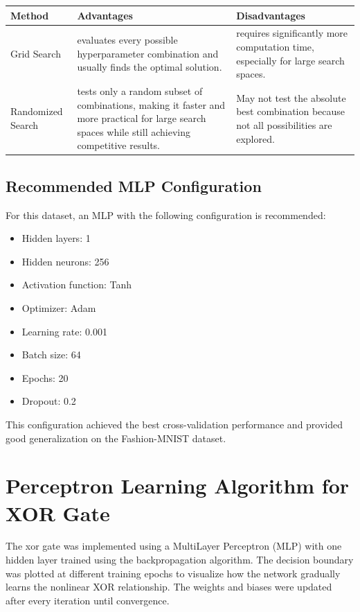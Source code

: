 \documentclass[11pt]{article}
\begin{document}
\begin{center}
\begin{tabular}{|p{4cm}|p{5cm}|p{5cm}|}
\hline
\textbf{Method} & \textbf{Advantages} & \textbf{Disadvantages}\\
\hline
Grid Search &
evaluates every possible hyperparameter combination and usually finds the optimal solution.
&
requires significantly more computation time, especially for large search spaces.
\\
\hline

Randomized Search &
tests only a random subset of combinations, making it faster and more practical for large search spaces while still achieving competitive results.
&
May not test the absolute best combination because not all possibilities are explored.
\\
\hline
\end{tabular}
\end{center}



\subsection{Recommended MLP Configuration}
For this dataset, an MLP with the following configuration is recommended:

\begin{itemize}
    \item Hidden layers: 1
    \item Hidden neurons: 256
    \item Activation function: Tanh
    \item Optimizer: Adam
    \item Learning rate: 0.001
    \item Batch size: 64
    \item Epochs: 20
    \item Dropout: 0.2
\end{itemize}
This configuration achieved the best cross-validation performance and provided good 
generalization   on the Fashion-MNIST dataset.
\section{Perceptron Learning Algorithm for XOR Gate}

The xor gate was implemented using a MultiLayer Perceptron (MLP) with one hidden layer trained using the backpropagation algorithm. The decision boundary was plotted at different training epochs to visualize how the network gradually learns the nonlinear XOR relationship. The weights and biases were updated after every iteration until convergence.
\end{document}
